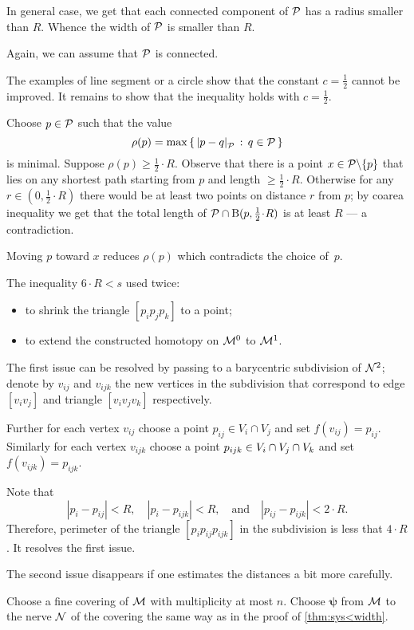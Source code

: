 In general case, we get that each connected component of $\mathcal{P}$ has a radius smaller than $R$.
Whence the width of $\mathcal{P}$ is smaller than $R$.

 Again, we can assume that $\mathcal{P}$ is connected.

The examples of line segment or a circle show that the constant $c=\tfrac12$ cannot be improved.
It remains to show that the inequality holds with $c=\tfrac12$.

Choose $p\in\mathcal{P}$ such that the value
\[\rho(p)=\max\set{\dist{p}{q}{\spc{P}}}{q\in\spc{P}}\]
is minimal.
Suppose $\rho(p)\ge\tfrac 12\cdot R$.
Observe that there is a point $x\z\in \spc{P}\backslash\{p\}$ that lies on any shortest path starting from $p$ and length $\ge\tfrac 12\cdot R$.
Otherwise for any $r\in(0,\tfrac 12\cdot R)$ there would be at least two points on distance $r$ from $p$;
by coarea inequality we get that the total length of $\spc{P}\cap \oBall(p,\tfrac 12\cdot R)$ is at least $R$ --- a contradiction.

Moving $p$ toward $x$ reduces $\rho(p)$ which contradicts the choice of~$p$.

The inequality $6\cdot R<s$ used twice:
\begin{itemize}
\item to shrink the triangle $[p_ip_jp_k]$ to a point;
\item to extend the constructed homotopy on $\mathcal{M}^0$ to $\mathcal{M}^1$.
\end{itemize}

The first issue can be resolved by passing to a barycentric subdivision of $\mathcal{N}^2$;
denote by $v_{ij}$ and $v_{ijk}$ the new vertices in the subdivision that correspond to edge $[v_iv_j]$ and triangle $[v_iv_jv_k]$ respectively.

Further for each vertex $v_{ij}$ choose a point $p_{ij}\in V_i\cap V_j$ and set $f(v_{ij})=p_{ij}$.
Similarly for each vertex $v_{ijk}$ choose a point $p_{ijk}\z\in V_i\cap V_j\cap V_k$ and set $f(v_{ijk})=p_{ijk}$.

Note that 
\[|p_i-p_{ij}|<R,\quad |p_i-p_{ijk}|<R,\quad\text{and}\quad |p_{ij}-p_{ijk}|<2\cdot R.\]
Therefore, perimeter of the triangle $[p_ip_{ij}p_{ijk}]$ in the subdivision is less that $4\cdot R$.
It resolves the first issue.

The second issue disappears if one estimates the distances a bit more carefully.
 
Choose a fine covering of $\mathcal{M}$ with multiplicity at most $n$.
Choose $\bm{\psi}$ from $\mathcal{M}$ to the nerve $\mathcal{N}$ of the covering the same way as in the proof of \ref{thm:sys<width}.

